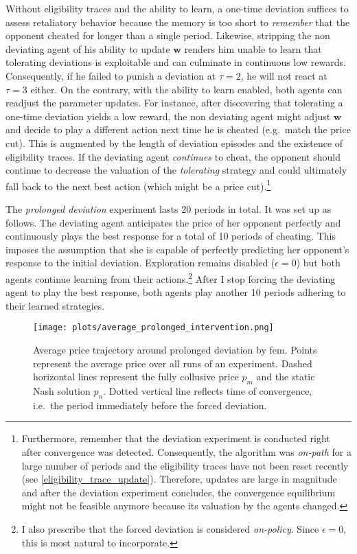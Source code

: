 Without eligibility traces and the ability to learn, a one-time deviation suffices to assess retaliatory behavior because the memory is too short to \emph{remember} that the opponent cheated for longer than a single period. Likewise, stripping the non deviating agent of his ability to update $\boldsymbol{w}$ renders him unable to learn that tolerating deviations is exploitable and can culminate in continuous low rewards. Consequently, if he failed to punish a deviation at $\tau = 2$, he will not react at $\tau = 3$ either. On the contrary, with the ability to learn enabled, both agents can readjust the parameter updates. For instance, after discovering that tolerating a one-time deviation yields a low reward, the non deviating agent might adjust $\boldsymbol{w}$ and decide to play a different action next time he is cheated (e.g.\ match the price cut). This is augmented by the length of deviation episodes and the existence of eligibility traces. If the deviating agent \emph{continues} to cheat, the opponent should continue to decrease the valuation of the \emph{tolerating} strategy and could ultimately fall back to the next best action (which might be a price cut).\footnote{Furthermore, remember that the deviation experiment is conducted right after convergence was detected. Consequently, the algorithm was \emph{on-path} for a large number of periods and the eligibility traces have not been reset recently (see \autoref{eligibility_trace_update}). Therefore, updates are large in magnitude and after the deviation experiment concludes, the convergence equilibrium might not be feasible anymore because its valuation by the agents changed.}

The \emph{prolonged deviation} experiment lasts 20 periods in total. It was set up as follows. The deviating agent anticipates the price of her opponent perfectly and continuously plays the best response for a total of 10 periods of cheating. This imposes the assumption that she is capable of perfectly predicting her opponent's response to the initial deviation. Exploration remains disabled ($\epsilon = 0$) but both agents continue learning from their actions.\footnote{I also prescribe that the forced deviation is considered \emph{on-policy}. Since $\epsilon = 0$, this is most natural to incorporate.} After I stop forcing the deviating agent to play the best response, both agents play another 10 periods adhering to their learned strategies.

\begin{figure}
	\texttt{[image: plots/average\_prolonged\_intervention.png]}
	\caption[Average price trajectory around prolonged deviation by \gls{fem}]{Average price trajectory around prolonged deviation by \gls{fem}. Points represent the average price over all runs of an experiment. Dashed horizontal lines represent the fully collusive price $p_m$ and the static Nash solution $p_n$. Dotted vertical line reflects time of convergence, i.e.\ the period immediately before the forced deviation.}
	\label{average_prolonged_intervention}
\end{figure}

